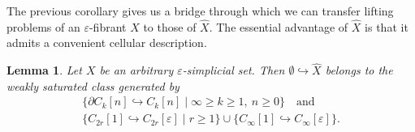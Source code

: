 \documentclass{article}
\theoremstyle{plain}
\newtheorem{lemma}[theorem]{Lemma}
\theoremstyle{definition}
\theoremstyle{remark}
\begin{document}
The previous corollary gives us a bridge through which we can transfer lifting problems of an $\varepsilon$-fibrant $X$ to those of $\widehat{X}$.
The essential advantage of $\widehat{X}$ is that it admits a convenient cellular description.
\begin{lemma}\label{lem:cellularStructureOfHatX}
    Let \(X\) be an arbitrary \(\varepsilon\)-simplicial set. Then
    \(\emptyset\hookrightarrow \widehat{X}\) belongs to the weakly saturated class generated by
    \begin{align}
        \{\partial C_k[n]\hookrightarrow C_k[n]
        \mid \infty\geq k\geq 1,\ n\geq 0\}
        \quad \text{and} \label{eq:genCyc}\\
        \{C_{2r}[1]\hookrightarrow C_{2r}[\varepsilon]\mid r\geq 1\}
        \cup
        \{C_\infty[1]\hookrightarrow C_\infty[\varepsilon]\}.
        \label{eq:genEpsCyc}
    \end{align}
\end{lemma}
\end{document}
